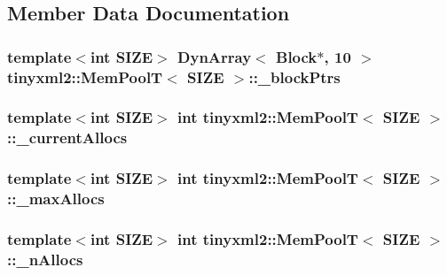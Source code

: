 \subsection{Member Data Documentation}
\hypertarget{classtinyxml2_1_1_mem_pool_t_af8eeecccb8c484c34ba04e3757e081be}{
\subsubsection[{\-\_\-block\-Ptrs}]{\setlength{\rightskip}{0pt plus 5cm}template$<$int S\-I\-Z\-E$>$ {\bf Dyn\-Array}$<$ {\bf Block}$\ast$, 10 $>$ {\bf tinyxml2\-::\-Mem\-Pool\-T}$<$ S\-I\-Z\-E $>$\-::\-\_\-block\-Ptrs\hspace{0.3cm}{\ttfamily [private]}}}\label{classtinyxml2_1_1_mem_pool_t_af8eeecccb8c484c34ba04e3757e081be}
\hypertarget{classtinyxml2_1_1_mem_pool_t_ae80f238a4c1fb0b2c037fd62b7bdd0c2}{
\subsubsection[{\-\_\-current\-Allocs}]{\setlength{\rightskip}{0pt plus 5cm}template$<$int S\-I\-Z\-E$>$ int {\bf tinyxml2\-::\-Mem\-Pool\-T}$<$ S\-I\-Z\-E $>$\-::\-\_\-current\-Allocs\hspace{0.3cm}{\ttfamily [private]}}}\label{classtinyxml2_1_1_mem_pool_t_ae80f238a4c1fb0b2c037fd62b7bdd0c2}
\hypertarget{classtinyxml2_1_1_mem_pool_t_ac757df646660b4e8eefaca0d385f97dd}{
\subsubsection[{\-\_\-max\-Allocs}]{\setlength{\rightskip}{0pt plus 5cm}template$<$int S\-I\-Z\-E$>$ int {\bf tinyxml2\-::\-Mem\-Pool\-T}$<$ S\-I\-Z\-E $>$\-::\-\_\-max\-Allocs\hspace{0.3cm}{\ttfamily [private]}}}\label{classtinyxml2_1_1_mem_pool_t_ac757df646660b4e8eefaca0d385f97dd}
\hypertarget{classtinyxml2_1_1_mem_pool_t_a1afde0bfad90d20643da123781664d7a}{
\subsubsection[{\-\_\-n\-Allocs}]{\setlength{\rightskip}{0pt plus 5cm}template$<$int S\-I\-Z\-E$>$ int {\bf tinyxml2\-::\-Mem\-Pool\-T}$<$ S\-I\-Z\-E $>$\-::\-\_\-n\-Allocs\hspace{0.3cm}{\ttfamily [private]}}}\label{classtinyxml2_1_1_mem_pool_t_a1afde0bfad90d20643da123781664d7a}
